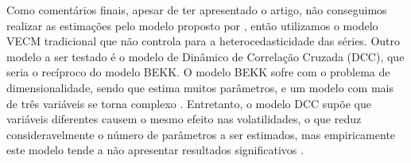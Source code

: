 Como comentários finais, apesar de ter apresentado o artigo, não conseguimos realizar as estimações pelo modelo proposto por  , então utilizamos o modelo VECM tradicional que não controla para a heterocedasticidade das séries. Outro modelo  a ser testado é o modelo de Dinâmico de Correlação Cruzada (DCC), que seria o recíproco do modelo BEKK. O modelo BEKK sofre com o problema de dimensionalidade, sendo que estima muitos parâmetros, e um modelo com mais de três variáveis se torna complexo \cite{tsay_multivariate_2013}. Entretanto, o modelo DCC supõe que  variáveis diferentes causem o mesmo efeito nas volatilidades, o que reduz consideravelmente o número de parâmetros a ser estimados, mas empiricamente este modelo tende a não apresentar resultados significativos \cite{tsay_multivariate_2013}.